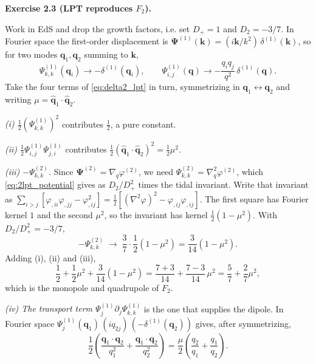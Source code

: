 \documentclass[a4paper,11pt]{article}
\newcommand{\vq}{\bm{q}}
\newcommand{\vk}{\bm{k}}
\newcommand{\vPsi}{\bm{\Psi}}
\newenvironment{solution}[1]
  {\par\medskip\noindent\textbf{#1}\par\nobreak\smallskip}
  {\par\medskip}
\begin{document}
\begin{solution}{Exercise 2.3 (LPT reproduces $F_2$).}
Work in EdS and drop the growth factors, i.e. set $D_+ = 1$ and
$D_2 = -3/7$. In Fourier space the first-order displacement is
$\vPsi^{(1)}(\vk) = (i\vk/k^2)\,\delta^{(1)}(\vk)$, so for two modes
$\vq_1, \vq_2$ summing to $\vk$,
\begin{equation*}
\Psi^{(1)}_{k,k}(\vq_i) \to -\delta^{(1)}(\vq_i) ,
\qquad
\Psi^{(1)}_{i,j}(\vq) \to -\frac{q_iq_j}{q^2}\,\delta^{(1)}(\vq) .
\end{equation*}
Take the four terms of \eqref{eq:delta2_lpt} in turn, symmetrizing in
$\vq_1 \leftrightarrow \vq_2$ and writing $\mu = \hat{\vq}_1\cdot\hat{\vq}_2$.

\emph{(i) $\tfrac12(\Psi^{(1)}_{k,k})^2$} contributes $\tfrac12$, a pure
constant.

\emph{(ii) $\tfrac12\Psi^{(1)}_{i,j}\Psi^{(1)}_{j,i}$} contributes
$\tfrac12(\hat{\vq}_1\cdot\hat{\vq}_2)^2 = \tfrac12\mu^2$.

\emph{(iii) $-\Psi^{(2)}_{k,k}$.} Since $\vPsi^{(2)} = \nabla_q\varphi^{(2)}$,
we need $\Psi^{(2)}_{k,k} = \nabla_q^2\varphi^{(2)}$, which
\eqref{eq:2lpt_potential} gives as $D_2/D_+^2$ times the tidal invariant. Write
that invariant as
$\sum_{i>j}[\varphi_{,ii}\varphi_{,jj} - \varphi_{,ij}^2]
= \tfrac12[(\nabla^2\varphi)^2 - \varphi_{,ij}\varphi_{,ij}]$. The first square
has Fourier kernel $1$ and the second $\mu^2$, so the invariant has kernel
$\tfrac12(1-\mu^2)$. With $D_2/D_+^2 = -3/7$,
\begin{equation*}
-\Psi^{(2)}_{k,k} \;\longrightarrow\; \frac{3}{7}\cdot\frac12\left(1-\mu^2\right)
= \frac{3}{14}\left(1-\mu^2\right).
\end{equation*}
Adding (i), (ii) and (iii),
\begin{equation*}
\frac12 + \frac12\mu^2 + \frac{3}{14}\left(1-\mu^2\right)
= \frac{7+3}{14} + \frac{7-3}{14}\,\mu^2
= \frac{5}{7} + \frac{2}{7}\mu^2 ,
\end{equation*}
which is the monopole and quadrupole of $F_2$.

\emph{(iv) The transport term $\Psi^{(1)}_j\partial_j\Psi^{(1)}_{k,k}$} is the
one that supplies the dipole. In Fourier space
$\Psi^{(1)}_j(\vq_1)\,(iq_{2j})\,(-\delta^{(1)}(\vq_2))$ gives, after
symmetrizing,
\begin{equation*}
\frac{1}{2}\left(\frac{\vq_1\cdot\vq_2}{q_1^2} + \frac{\vq_1\cdot\vq_2}{q_2^2}\right)
= \frac{\mu}{2}\left(\frac{q_2}{q_1}+\frac{q_1}{q_2}\right).
\end{equation*}


\end{solution}
\end{document}
